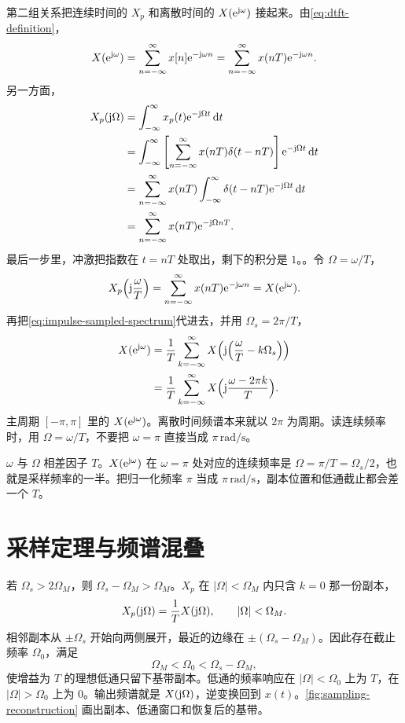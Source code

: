 第二组关系把连续时间的 $X_p$ 和离散时间的 $X(\mathrm{e}^{\mathrm{j}\omega})$ 接起来。由\cref{eq:dtft-definition}，
\[
  X(\mathrm{e}^{\mathrm{j}\omega})
  =\sum_{n=-\infty}^{\infty}x[n]\mathrm{e}^{-\mathrm{j}\omega n}
  =\sum_{n=-\infty}^{\infty}x(nT)\mathrm{e}^{-\mathrm{j}\omega n}.
\]
另一方面，
\begin{align*}
  X_p(\mathrm{j}\Omega)
  &=\int_{-\infty}^{\infty}x_p(t)\mathrm{e}^{-\mathrm{j}\Omega t}\mathop{}\!\mathrm{d} t\\
  &=\int_{-\infty}^{\infty}
    \left[\sum_{n=-\infty}^{\infty}x(nT)\delta(t-nT)\right]
    \mathrm{e}^{-\mathrm{j}\Omega t}\mathop{}\!\mathrm{d} t\\
  &=\sum_{n=-\infty}^{\infty}x(nT)
    \int_{-\infty}^{\infty}\delta(t-nT)\mathrm{e}^{-\mathrm{j}\Omega t}\mathop{}\!\mathrm{d} t\\
  &=\sum_{n=-\infty}^{\infty}x(nT)\mathrm{e}^{-\mathrm{j}\Omega nT}.
\end{align*}
最后一步里，冲激把指数在 $t=nT$ 处取出，剩下的积分是 $1$。。令 $\Omega=\omega/T$，
\[
  X_p\Bigl(\mathrm{j}\frac{\omega}{T}\Bigr)
  =\sum_{n=-\infty}^{\infty}x(nT)\mathrm{e}^{-\mathrm{j}\omega n}
  =X(\mathrm{e}^{\mathrm{j}\omega}).
\]
再把\cref{eq:impulse-sampled-spectrum}代进去，并用 $\Omega_s=2\pi/T$，
\begin{align*}
  X(\mathrm{e}^{\mathrm{j}\omega})
  &=\frac1T\sum_{k=-\infty}^{\infty}
    X\Bigl(\mathrm{j}\Bigl(\frac{\omega}{T}-k\Omega_s\Bigr)\Bigr)\\
  &=\frac1T\sum_{k=-\infty}^{\infty}
    X\Bigl(\mathrm{j}\frac{\omega-2\pi k}{T}\Bigr).
\end{align*}
主周期 $[-\pi,\pi]$ 里的 $X(\mathrm{e}^{\mathrm{j}\omega})$。离散时间频谱本来就以 $2\pi$ 为周期。读连续频率时，用 $\Omega=\omega/T$，不要把 $\omega=\pi$ 直接当成 $\pi\,\mathrm{rad/s}$。

\begin{pitfall}[把两种频率当成同一个数]
  $\omega$ 与 $\Omega$ 相差因子 $T$。$X(\mathrm{e}^{\mathrm{j}\omega})$ 在 $\omega=\pi$ 处对应的连续频率是 $\Omega=\pi/T=\Omega_s/2$，也就是采样频率的一半。把归一化频率 $\pi$ 当成 $\pi\,\mathrm{rad/s}$，副本位置和低通截止都会差一个 $T$。
\end{pitfall}

\section{采样定理与频谱混叠}
\label{sec:sampling-theorem}

若 $\Omega_s>2\Omega_M$，则 $\Omega_s-\Omega_M>\Omega_M$。$X_p$ 在 $|\Omega|<\Omega_M$ 内只含 $k=0$ 那一份副本，
\[
  X_p(\mathrm{j}\Omega)=\frac1T X(\mathrm{j}\Omega),
  \qquad |\Omega|<\Omega_M.
\]
相邻副本从 $\pm\Omega_s$ 开始向两侧展开，最近的边缘在 $\pm(\Omega_s-\Omega_M)$。因此存在截止频率 $\Omega_0$，满足
\begin{equation}
  \Omega_M<\Omega_0<\Omega_s-\Omega_M,
  \label{eq:sampling-cutoff-gap}
\end{equation}
使增益为 $T$ 的理想低通只留下基带副本。低通的频率响应在 $|\Omega|<\Omega_0$ 上为 $T$，在 $|\Omega|>\Omega_0$ 上为 $0$。输出频谱就是 $X(\mathrm{j}\Omega)$，逆变换回到 $x(t)$。\cref{fig:sampling-reconstruction} 画出副本、低通窗口和恢复后的基带。

